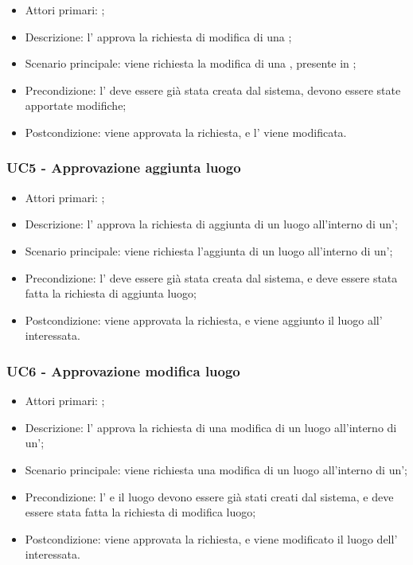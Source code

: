 \documentclass[../analisi-dei-requisiti]{subfiles}
\begin{document}
\begin{itemize}
\item Attori primari: ;
\item Descrizione: l' approva la richiesta di modifica di una ;
\item Scenario principale: viene richiesta la modifica di una , presente in ;
\item Precondizione: l' deve essere già stata creata dal sistema, devono essere state apportate modifiche;
\item Postcondizione: viene approvata la richiesta, e l' viene modificata.

\end{itemize}
\subsubsection{UC5 - Approvazione aggiunta luogo}
\label{subsub:UC5}

\begin{itemize}
\item Attori primari: ;
\item Descrizione: l' approva la richiesta di aggiunta di un luogo all'interno di un';
\item Scenario principale: viene richiesta l'aggiunta di un luogo all'interno di un';
\item Precondizione: l' deve essere già stata creata dal sistema, e deve essere stata fatta la richiesta di aggiunta luogo;
\item Postcondizione: viene approvata la richiesta, e viene aggiunto il luogo all' interessata.

\end{itemize}
\subsubsection{UC6 - Approvazione modifica luogo}
\label{subsub:UC6}

\begin{itemize}
\item Attori primari: ;
\item Descrizione: l' approva la richiesta di una modifica di un luogo all'interno di un';
\item Scenario principale: viene richiesta una modifica di un luogo all'interno di un';
\item Precondizione: l' e il luogo devono essere già stati creati dal sistema, e deve essere stata fatta la richiesta di modifica luogo;
\item Postcondizione: viene approvata la richiesta, e viene modificato il luogo dell' interessata.

\end{itemize}
\end{document}
